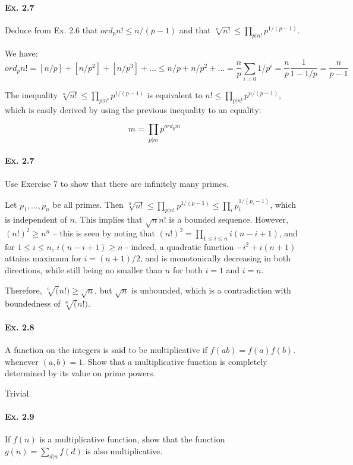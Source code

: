\documentclass[notitlepage]{article}
\theoremstyle{definition}
\begin{document}
\paragraph{Ex. 2.7}
Deduce from Ex. 2.6 that $ord_p n! \leq n/(p - 1)$ and that
$\sqrt[n]{n!} \leq \prod_{p|n!} p^{1/(p-1)}$.

We have:
\begin{equation}
ord_p n! = [n/p] + [n/p^2] + [n/p^3] + \ldots \leq n/p + n/p^2 +
\ldots = \frac{n}{p}\sum_{i = 0} 1/p^i = \frac{n}{p}\frac{1}{1-1/p} = \frac{n}{p-1}
\end{equation}

The inequality $\sqrt[n]{n!} \leq \prod_{p|n!} p^{1/(p-1)}$ is
equivalent to $n! \leq \prod_{p|n!} p^{n/(p-1)}$, which is easily
derived by using the previous inequality to an equality:

\begin{equation}
  m = \prod_{p|m} p^{ord_p m}
\end{equation}

\paragraph{Ex. 2.7}
Use Exercise 7 to show that there are infinitely many primes.

Let $p_1, \ldots, p_n$ be all primes. Then $\sqrt[n]{n!} \leq
\prod_{p|n!} p^{1/(p-1)} \leq \prod_i p_i^{1/(p_i - 1)}$, which is
independent of $n$. This implies that $\sqrt{n}{n!}$ is a bounded
sequence. However, $(n!)^2 \geq n^n$ -- this is seen by noting that
$(n!)^2 = \prod_{1 \leq i \leq n} i(n-i+1)$, and for $1 \leq i \leq
n$, $i(n-i+1) \geq n$ - indeed, a quadratic function $-i^2 + i(n+1)$
attains maximum for $i = (n+1)/2$, and is monotonically decreasing in
both directions, while still being no smaller than $n$ for both $i =
1$ and $i = n$.

Therefore, $\sqrt[n](n!) \geq \sqrt{n}$, but $\sqrt{n}$ is unbounded,
which is a contradiction with boundedness of $\sqrt[n](n!)$.

\paragraph{Ex. 2.8}
A function on the integers is said to be multiplicative if $f(ab) =
f(a)f(b)$. whenever $(a, b) = 1$. Show that a multiplicative function
is completely determined by its value on prime powers.

Trivial.

\paragraph{Ex. 2.9}
If $f(n)$ is a multiplicative function, show that the function $g(n) =
\sum_{d|n} f(d)$ is also multiplicative.
\end{document}
